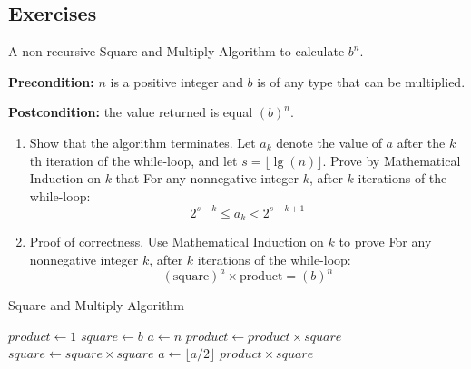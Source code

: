 \subsection{Exercises}
\begin{exercise}
    A non-recursive Square and Multiply Algorithm to calculate \( b^n \).

\textbf{Precondition:} \( n \) is a positive integer and \( b \) is of any type that can be multiplied.

\textbf{Postcondition:} the value returned is equal \( (b)^n \).

\begin{enumerate}
    \item Show that the algorithm terminates. Let \( a_k \) denote the value of \( a \) after the \( k \)th iteration of the while-loop, and let \( s = \lfloor \lg(n) \rfloor \). Prove by Mathematical Induction on \( k \) that For any nonnegative integer \( k \), after \( k \) iterations of the while-loop:
    $$2^{s-k} \le a_k < 2^{s-k+1}$$
    \item  Proof of correctness. Use Mathematical Induction on \( k \) to prove For any nonnegative integer \( k \), after \( k \) iterations of the while-loop:
\[ (\text{square})^a \times \text{product} = (b)^n \]
\end{enumerate}
\end{exercise}
\begin{algorithm}
    \caption{Square and Multiply Algorithm}
    \begin{algorithmic}[1]
    \State $product \gets 1$
    \State $square \gets b$
    \State $a \gets n$
         
            \State $product \gets product \times square$
        \EndIf
        \State $square \gets square \times square$
        \State $a \gets \lfloor a / 2 \rfloor$ 
    \EndWhile
    \State \Return $product \times square$
    \end{algorithmic}
\end{algorithm}
